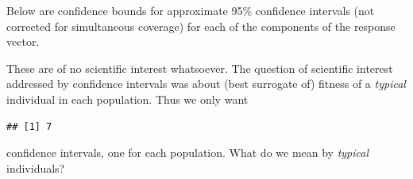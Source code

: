 \documentclass[
  ignorenonframetext,
]{beamer}
\newenvironment{Shaded}{\begin{snugshade}}{\end{snugshade}}
\newcommand{\FloatTok}[1]{\textcolor[rgb]{0.00,0.00,0.81}{#1}}
\newcommand{\FunctionTok}[1]{\textcolor[rgb]{0.13,0.29,0.53}{\textbf{#1}}}
\newcommand{\NormalTok}[1]{#1}
\newcommand{\OtherTok}[1]{\textcolor[rgb]{0.56,0.35,0.01}{#1}}
\newcommand{\SpecialCharTok}[1]{\textcolor[rgb]{0.81,0.36,0.00}{\textbf{#1}}}
\begin{document}
\begin{frame}[fragile]{}
\protect\hypertarget{section-29}{}
Below are confidence bounds for approximate 95\% confidence intervals
(not corrected for simultaneous coverage) for each of the components of
the response vector.

\vspace{12pt}
\tiny

\begin{Shaded}
\end{Shaded}

\vspace{12pt}
\normalsize

These are of no scientific interest whatsoever. The question of
scientific interest addressed by confidence intervals was about (best
surrogate of) fitness of a \emph{typical} individual in each population.
Thus we only want

\vspace{12pt}
\tiny

\begin{Shaded}
\end{Shaded}

\begin{verbatim}
## [1] 7
\end{verbatim}

\vspace{12pt}
\normalsize

confidence intervals, one for each population. What do we mean by
\emph{typical} individuals?
\end{frame}
\end{document}
